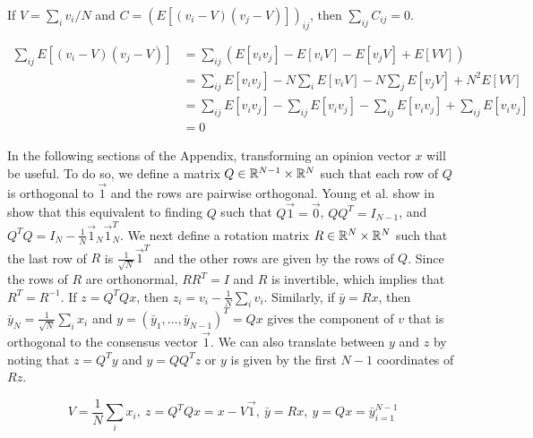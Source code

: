 \documentclass{article}
\DeclareRobustCommand{\cite}[1]{\citep{#1}}
\begin{document}
\begin{fact} \label{sum_cov}
If $V=\sum_iv_i/N$ and $C=\left(E[(v_i-V)(v_j-V)]\right)_{ij}$, then $\sum_{ij}C_{ij}=0$.
\end{fact}
\begin{pf}
\begin{align*}
\sum_{ij}E[(v_i-V)(v_j-V)]&=\sum_{ij}\left(E[v_iv_j]-E[v_iV]-E[v_jV]+E[VV]\right)
\\&=\sum_{ij}E[v_iv_j]-N\sum_iE[v_iV]-N\sum_jE[v_jV]+N^2E[VV]
\\&=\sum_{ij}E[v_iv_j]-\sum_{ij}E[v_iv_j]-\sum_{ij}E[v_iv_j]+\sum_{ij}E[v_iv_j]
\\&=0
\end{align*}
\end{pf}

In the following sections of the Appendix, transforming an opinion vector $x$ will be useful.  To do so, we define a matrix $Q\in{\mathbb{R}}^{N-1}\times{\mathbb{R}}^N$ such that each row of $Q$ is orthogonal to $\vec{1}$ and the rows are pairwise orthogonal. Young et al. show in \cite{Young:2010fk} show that this equivalent to finding $Q$ such that $Q\vec{1}=\vec{0}$, $QQ^T=I_{N-1}$, and $Q^TQ=I_N-\frac{1}{N}\vec{1}_N\vec{1}_N^T$.  We next define a rotation matrix $R\in{\mathbb{R}}^N\times{\mathbb{R}}^N$ such that the last row of $R$ is $\frac{1}{\sqrt{N}}\vec{1}^T$ and the other rows are given by the rows of $Q$. Since the rows of $R$ are orthonormal, $RR^T=I$ and $R$ is invertible, which implies that $R^T=R^{-1}$. If $z=Q^TQx$, then $z_i=v_i-\frac{1}{N}\sum_iv_i$. Similarly, if $\bar{y}=Rx$, then $\bar{y}_N=\frac{1}{\sqrt{N}}\sum_ix_i$ and $y=(\bar{y}_1,\dots,\bar{y}_{N-1})^T=Qx$ gives the component of $v$ that is orthogonal to the consensus vector $\vec{1}$. We can also translate between $y$ and $z$ by noting that $z=Q^Ty$ and $y=QQ^Tz$ or $y$ is given by the first $N-1$ coordinates of $Rz$.

\begin{equation} \label{transformations}
 \boxed{V=\frac{1}{N}\sum_ix_i ,\ z=Q^TQx=x-V\vec{1}, \ \bar{y}=Rx,\ y=Qx=\bar{y}_{i=1}^{N-1}}
 \end{equation}
 
\end{document}
